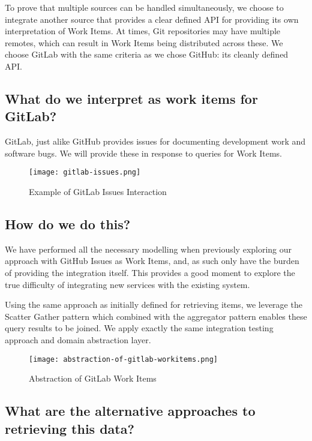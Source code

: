 To prove that multiple sources can be handled simultaneously, we choose to integrate another source that provides a clear defined API for providing its own interpretation of Work Items. At times, Git repositories may have multiple remotes, which can result in Work Items being distributed across these. We choose GitLab with the same criteria as we chose GitHub: its cleanly defined API.


\subsection{What do we interpret as work items for GitLab?}

GitLab, just alike GitHub provides issues for documenting development work and software bugs. We will provide these in response to queries for Work Items.

\begin{figure}[h!]
	\centering
	\texttt{[image: gitlab-issues.png]}
	\label{fig:gitlabIssuesExample}
	\caption{Example of GitLab Issues Interaction}
\end{figure}

\subsection{How do we do this?}

We have performed all the necessary modelling when previously exploring our approach with GitHub Issues as Work Items, and, as such only have the burden of providing the integration itself. This provides a good moment to explore the true difficulty of integrating new services with the existing system.

Using the same approach as initially defined for retrieving items, we leverage the Scatter Gather pattern which combined with the aggregator pattern enables these query results to be joined. We apply exactly the same integration testing approach and domain abstraction layer.

\begin{figure}[h!]
	\centering
	\texttt{[image: abstraction-of-gitlab-workitems.png]}
	\caption{Abstraction of GitLab Work Items}
	\label{fig:abstractionOfGitLabWorkItems}
\end{figure}

\subsection{What are the alternative approaches to retrieving this data?}

